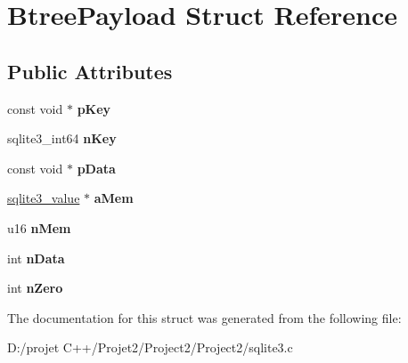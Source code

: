 \hypertarget{struct_btree_payload}{}\section{Btree\+Payload Struct Reference}
\label{struct_btree_payload}
\subsection*{Public Attributes}
\begin{DoxyCompactItemize}
\item 
\mbox{\label{struct_btree_payload_a8122b6f070adf318fe4d5131cf877ef3}} 
const void $\ast$ {\bfseries p\+Key}
\item 
\mbox{\label{struct_btree_payload_ab47f827f8ad41b179f25693d867795a5}} 
sqlite3\+\_\+int64 {\bfseries n\+Key}
\item 
\mbox{\label{struct_btree_payload_af45874b2d6119c220280e4ebcd917662}} 
const void $\ast$ {\bfseries p\+Data}
\item 
\mbox{\label{struct_btree_payload_a6fd089fe846d50ada04220f8ad5584c5}} 
\mbox{\hyperlink{structsqlite3__value}{sqlite3\+\_\+value}} $\ast$ {\bfseries a\+Mem}
\item 
\mbox{\label{struct_btree_payload_a460fd28373854e48577b8a378dfa572d}} 
u16 {\bfseries n\+Mem}
\item 
\mbox{\label{struct_btree_payload_a515a370eeb96e103dd716fa5149f2787}} 
int {\bfseries n\+Data}
\item 
\mbox{\label{struct_btree_payload_ab9c8ecd88e88f7374f95c8b4bccdf946}} 
int {\bfseries n\+Zero}
\end{DoxyCompactItemize}


The documentation for this struct was generated from the following file\+:\begin{DoxyCompactItemize}
\item 
D\+:/projet C++/\+Projet2/\+Project2/\+Project2/sqlite3.\+c\end{DoxyCompactItemize}
